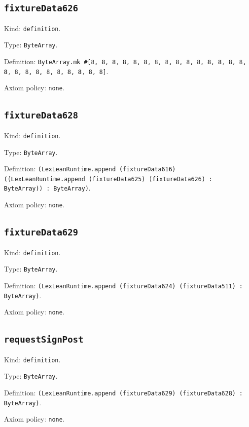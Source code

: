\documentclass[11pt]{article}
\begin{document}
\subsection*{\texttt{fixtureData626}}
\noindent Kind: \texttt{definition}.\par
\noindent Type: \texttt{ByteArray}.\par
\noindent Definition: \texttt{ByteArray.mk \#[8, 8, 8, 8, 8, 8, 8, 8, 8, 8, 8, 8, 8, 8, 8, 8, 8, 8, 8, 8, 8, 8, 8, 8, 8]}.\par
\noindent Axiom policy: \texttt{none}.\par
\subsection*{\texttt{fixtureData628}}
\noindent Kind: \texttt{definition}.\par
\noindent Type: \texttt{ByteArray}.\par
\noindent Definition: \texttt{(LexLeanRuntime.append (fixtureData616) ((LexLeanRuntime.append (fixtureData625) (fixtureData626) : ByteArray)) : ByteArray)}.\par
\noindent Axiom policy: \texttt{none}.\par
\subsection*{\texttt{fixtureData629}}
\noindent Kind: \texttt{definition}.\par
\noindent Type: \texttt{ByteArray}.\par
\noindent Definition: \texttt{(LexLeanRuntime.append (fixtureData624) (fixtureData511) : ByteArray)}.\par
\noindent Axiom policy: \texttt{none}.\par
\subsection*{\texttt{requestSignPost}}
\noindent Kind: \texttt{definition}.\par
\noindent Type: \texttt{ByteArray}.\par
\noindent Definition: \texttt{(LexLeanRuntime.append (fixtureData629) (fixtureData628) : ByteArray)}.\par
\noindent Axiom policy: \texttt{none}.\par
\end{document}
